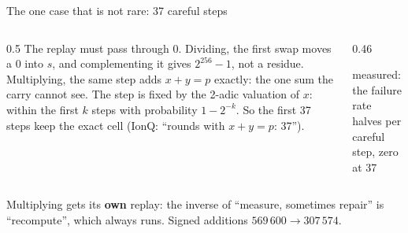 \documentclass[aspectratio=169,11pt]{beamer}
\begin{document}
\setcounter{framenumber}{176}
\begin{frame}{The one case that is not rare: 37 careful steps}
  \begin{columns}[c]
    \begin{column}{0.5\textwidth}
      \small The replay must pass through $0$. Dividing, the first swap moves a $0$ into $s$, and complementing it gives $2^{256}-1$, not a residue. Multiplying, the same step adds $x+y=p$ exactly: the one sum the carry cannot see.
      \vskip2mm
      The step is fixed by the 2-adic valuation of $x$: within the first $k$ steps with probability $1-2^{-k}$. So the first 37 steps keep the exact cell (IonQ: ``rounds with $x+y=p$: 37'').
    \end{column}
    \begin{column}{0.46\textwidth}
      \centering
      \par
      {\scriptsize measured: the failure rate halves per careful step, zero at 37}
    \end{column}
  \end{columns}
  \vskip2mm
  {\small Multiplying gets its \textbf{own} replay: the inverse of ``measure, sometimes repair'' is ``recompute'', which always runs. Signed additions $569\,600\to307\,574$.}
\end{frame}
\end{document}

